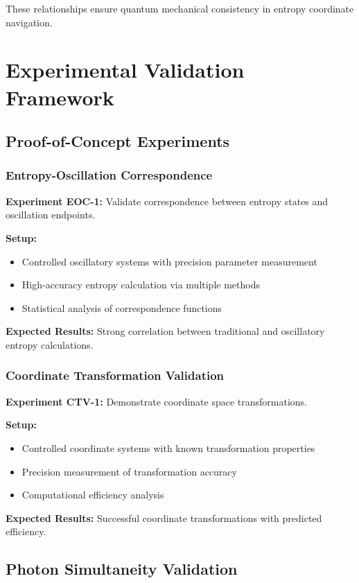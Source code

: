 \documentclass[12pt,a4paper]{article}
\begin{document}
These relationships ensure quantum mechanical consistency in entropy coordinate navigation.

\section{Experimental Validation Framework}

\subsection{Proof-of-Concept Experiments}

\subsubsection{Entropy-Oscillation Correspondence}

\textbf{Experiment EOC-1:} Validate correspondence between entropy states and oscillation endpoints.

\textbf{Setup:}
\begin{itemize}
\item Controlled oscillatory systems with precision parameter measurement
\item High-accuracy entropy calculation via multiple methods
\item Statistical analysis of correspondence functions
\end{itemize}

\textbf{Expected Results:} Strong correlation between traditional and oscillatory entropy calculations.

\subsubsection{Coordinate Transformation Validation}

\textbf{Experiment CTV-1:} Demonstrate coordinate space transformations.

\textbf{Setup:}
\begin{itemize}
\item Controlled coordinate systems with known transformation properties  
\item Precision measurement of transformation accuracy
\item Computational efficiency analysis
\end{itemize}

\textbf{Expected Results:} Successful coordinate transformations with predicted efficiency.

\subsection{Photon Simultaneity Validation}
\end{document}
